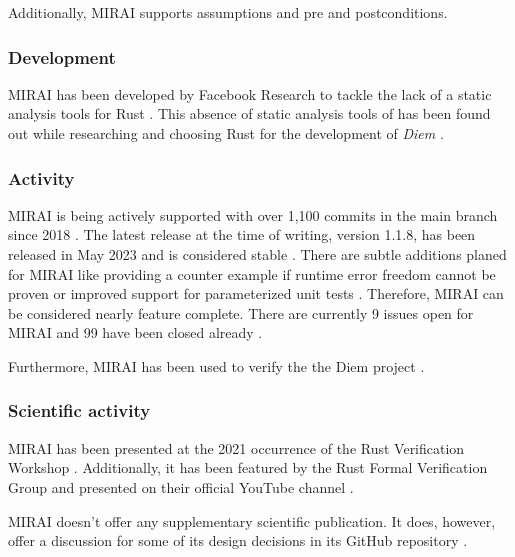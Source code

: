 Additionally, MIRAI supports assumptions and pre and postconditions.

\subsubsection{Development}
MIRAI has been developed by Facebook Research to tackle the lack of a static analysis tools for Rust \cite{facebookexperimental_miraidocumentationoverviewmd_2021}. This absence of static analysis tools of has been found out while researching and choosing Rust for the development of \textit{Diem} \cite{diem_diemdiem_2023} \cite{facebookexperimental_miraidocumentationoverviewmd_2021}.

\subsubsection{Activity}
MIRAI is being actively supported with over 1,100 commits in the main branch since 2018 \cite{facebookexperimental_facebookexperimentalmirai_2023}. The latest release at the time of writing, version 1.1.8, has been released in May 2023 \cite{facebookexperimental_release_2023} and is considered stable \cite{facebookexperimental_miraidocumentationoverviewmd_2021}. There are subtle additions planed for MIRAI like providing a counter example if runtime error freedom cannot be proven or improved support for parameterized unit tests \cite{facebookexperimental_miraidocumentationoverviewmd_2021}. Therefore, MIRAI can be considered nearly feature complete. There are currently 9 issues open for MIRAI and 99 have  been closed already \cite{facebookexperimental_issues_2023}.

Furthermore, MIRAI has been used to verify the the Diem project \cite{diem_diemdiem_2023}.

\subsubsection{Scientific activity}

MIRAI has been presented at the 2021 occurrence of the Rust Verification Workshop \cite{peter_muller_rust_2021}. Additionally, it has been featured by the Rust Formal Verification Group \cite{rust_formal_methods_interest_group_tools_2021} and presented on their official YouTube channel \cite{rust_formal_methods_ig_january_2022}.

MIRAI doesn't offer any supplementary scientific publication. It does, however, offer a discussion for some of its design decisions in its GitHub repository \cite{facebookexperimental_miraidocumentationdecisionsmd_2022}.

